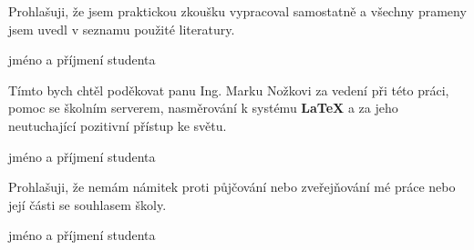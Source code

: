 
\newenvironment{signaturedtext}{}{%
	\newline
    \begin{flushright}
		\begin{minipage}[H]{.5\textwidth}
			\begin{center}
				\dotfill\newline
				jméno a příjmení studenta
			\end{center}		
		\end{minipage}
	\end{flushright}%
}

\clearpage
\thispagestyle{empty}

\begin{signaturedtext}
	Prohlašuji, že jsem praktickou zkoušku vypracoval samostatně a všechny prameny jsem uvedl v seznamu použité literatury.
\end{signaturedtext}

\vspace*{\fill}

\begin{signaturedtext}
	Tímto bych chtěl poděkovat panu Ing. Marku Nožkovi za vedení při této práci, pomoc se školním serverem, nasměrování k systému \textbf{\LaTeX} a za jeho neutuchající pozitivní přístup ke světu.
\end{signaturedtext}
	
\vfill
	
\begin{signaturedtext}
	Prohlašuji, že nemám námitek proti půjčování nebo zveřejňování mé práce nebo její části se souhlasem školy.
\end{signaturedtext}

\clearpage